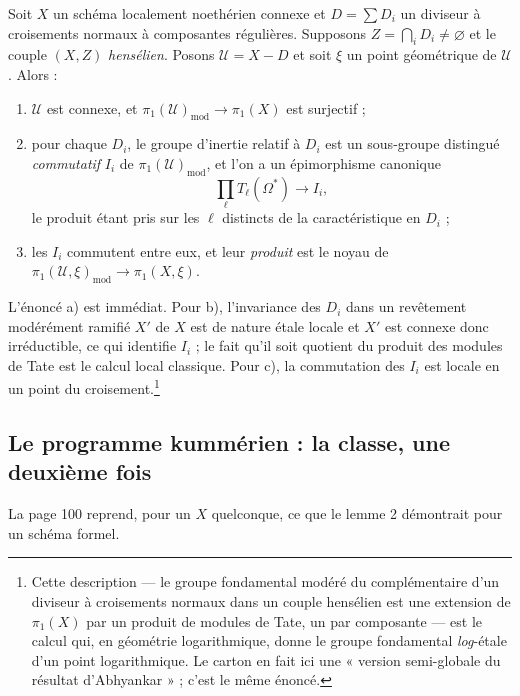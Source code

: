 \documentclass[11pt,a4paper]{article}
\begin{document}
Soit $X$ un schéma localement noethérien connexe et $D = \sum D_{i}$ un
diviseur à croisements normaux à composantes régulières. Supposons
$Z = \bigcap_{i} D_{i} \neq \varnothing$ et le couple $(X, Z)$
\emph{hensélien}. Posons $\mathcal{U} = X - D$ et soit $\xi$ un point
géométrique de $\mathcal{U}$. Alors :

\begin{enumerate}
  \item[a)] $\mathcal{U}$ est connexe, et
    $\pi_{1}(\mathcal{U})_{\mathrm{mod}} \to \pi_{1}(X)$ est surjectif ;
  \item[b)] pour chaque $D_{i}$, le groupe d'inertie relatif à $D_{i}$ est un
    sous-groupe distingué \emph{commutatif} $I_{i}$ de
    $\pi_{1}(\mathcal{U})_{\mathrm{mod}}$, et l'on a un épimorphisme canonique
    \[
      \prod_{\ell} T_{\ell}(\Omega^{*}) \longrightarrow I_{i} ,
    \]
    le produit étant pris sur les $\ell$ distincts de la caractéristique en
    $D_{i}$ ;
  \item[c)] les $I_{i}$ commutent entre eux, et leur \emph{produit} est le
    noyau de
    $\pi_{1}(\mathcal{U}, \xi)_{\mathrm{mod}} \to \pi_{1}(X, \xi)$.
\end{enumerate}

L'énoncé a) est immédiat. Pour b), l'invariance des $D_{i}$ dans un revêtement
modérément ramifié $X'$ de $X$ est de nature étale locale et $X'$ est connexe
donc irréductible, ce qui identifie $I_{i}$ ; le fait qu'il soit quotient du
produit des modules de Tate est le calcul local classique. Pour c), la
commutation des $I_{i}$ est locale en un point du
croisement.\footnote{Cette description --- le groupe fondamental modéré du
complémentaire d'un diviseur à croisements normaux dans un couple hensélien
est une extension de $\pi_{1}(X)$ par un produit de modules de Tate, un par
composante --- est le calcul qui, en géométrie logarithmique, donne le groupe
fondamental \emph{log}-étale d'un point logarithmique. Le carton en fait ici
une « version semi-globale du résultat d'Abhyankar » ; c'est le même énoncé.}

\subsection*{Le programme kummérien : la classe, une deuxième fois}

La page 100 reprend, pour un $X$ quelconque, ce que le lemme 2 démontrait pour
un schéma formel.
\end{document}
